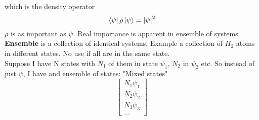 \documentclass{scrartcl}
\begin{document}
which is the density operator
\[\bra{\psi} \rho \ket{\psi} = \abs{\psi}^2 \]
\( \rho \) is as important as \( \psi \). Real importance is apparent in ensemble of systems.\\
\textbf{Ensemble} is a collection of identical systems. Example a collection of \( H_2 \) atoms in different states. No use if all are in the same state.\\
Suppose I have N states with \( N_1 \) of them in state \( \psi_1 \), \( N_2 \) in \( \psi_2 \) etc.
So instead of just \( \psi \), I have and ensemble of states: "Mixed states" 
\begin{equation}
\begin{bmatrix}
	 N_1 \psi_1\\
	 N_2 \psi_2\\
	 N_3 \psi_3\\
	...
\end{bmatrix}
\end{equation}
\end{document}
